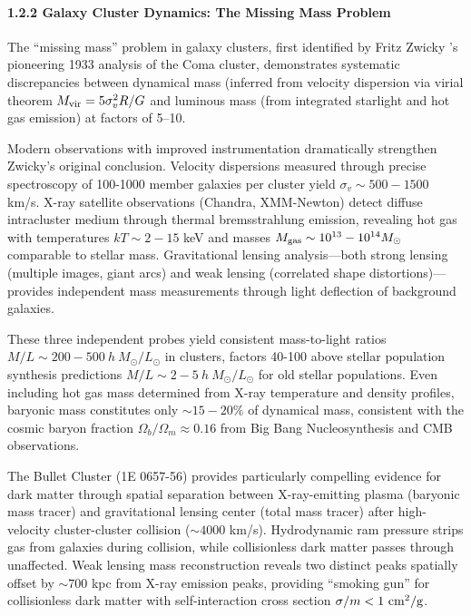 \documentclass[10pt,a4paper]{article}
\begin{document}
\paragraph{1.2.2 Galaxy Cluster Dynamics: The Missing Mass
Problem}\label{galaxy-cluster-dynamics-the-missing-mass-problem}

The ``missing mass'' problem in galaxy clusters, first identified by
Fritz Zwicky \cite{Zwicky1933}'s pioneering 1933 analysis of the Coma cluster,
demonstrates systematic discrepancies between dynamical mass (inferred
from velocity dispersion via virial theorem
\(M_{\rm vir} = 5\sigma_v^2 R/G\) and luminous mass (from integrated
starlight and hot gas emission) at factors of 5--10.

Modern observations with improved instrumentation dramatically
strengthen Zwicky's original conclusion. Velocity dispersions measured
through precise spectroscopy of 100-1000 member galaxies per cluster
yield \(\sigma_v \sim 500-1500\) km/s. X-ray satellite observations
(Chandra, XMM-Newton) detect diffuse intracluster medium through thermal
bremsstrahlung emission, revealing hot gas with temperatures
\(kT \sim 2-15\) keV and masses
\(M_{\rm gas} \sim 10^{13}-10^{14} M_\odot\) comparable to stellar mass.
Gravitational lensing analysis---both strong lensing (multiple images,
giant arcs) and weak lensing (correlated shape distortions)---provides
independent mass measurements through light deflection of background
galaxies.

These three independent probes yield consistent mass-to-light ratios
\(M/L \sim 200-500~h~M_\odot/L_\odot\) in clusters, factors 40-100 above
stellar population synthesis predictions
\(M/L \sim 2-5~h~M_\odot/L_\odot\) for old stellar populations. Even
including hot gas mass determined from X-ray temperature and density
profiles, baryonic mass constitutes only \(\sim 15-20\%\) of dynamical
mass, consistent with the cosmic baryon fraction
\(\Omega_b/\Omega_m \approx 0.16\) from Big Bang Nucleosynthesis and CMB
observations.

The Bullet Cluster (1E 0657-56) provides particularly compelling
evidence for dark matter through spatial separation between
X-ray-emitting plasma (baryonic mass tracer) and gravitational lensing
center (total mass tracer) after high-velocity cluster-cluster collision
(\(\sim 4000\) km/s). Hydrodynamic ram pressure strips gas from galaxies
during collision, while collisionless dark matter passes through
unaffected. Weak lensing mass reconstruction reveals two distinct peaks
spatially offset by \(\sim 700\) kpc from X-ray emission peaks,
providing ``smoking gun'' for collisionless dark matter with
self-interaction cross section \(\sigma/m < 1~{\rm cm^2/g}\).
\end{document}

